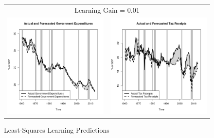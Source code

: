 \documentclass[11pt]{article}
\begin{document}
\begin{figure}\caption{Least-Squares Learning Predictions}\label{fg:forecasts0.01}
\begin{center}
\begin{tabular}{cc}
\multicolumn{2}{c}{Learning Gain = 0.01} \\ [0.5pc]
\includegraphics[scale=0.45]{./results/pics0.01/pred_gov.png} & \includegraphics[scale=0.45]{./results/pics0.01/pred_tax.png} \\

\end{tabular}
\end{center}
\end{figure}
\end{document}
